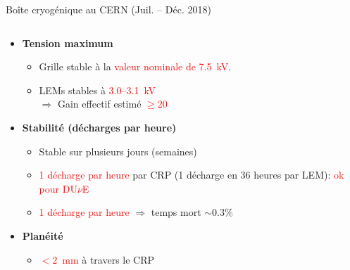 \begin{frame}{Boîte cryogénique au CERN (Juil. -- Déc. 2018)}
\begin{columns}
\begin{column}{0.6\textwidth}
\begin{scriptsize}
	    			\begin{itemize}
	    				\item \textbf{Tension maximum}
	    				\begin{itemize}
	    					\item Grille stable à la \textcolor{red}{valeur nominale de \SI{7.5}{\kilo\volt}}.
	    					\item LEMs stables à \textcolor{red}{3.0--\SI{3.1}{\kilo\volt}}\\
				    					$\Rightarrow$ Gain effectif estimé \textcolor{red}{$\geq 20$}
	    				\end{itemize}
	    				\item \textbf{Stabilité (décharges par heure)}
	    				\begin{itemize}
	    					\item Stable sur plusieurs jours (semaines)
	    					\item \textcolor{red}{1 décharge par heure} par CRP (1 décharge en 36 heures par LEM): \textcolor{red}{ok pour DU$\nu$E}
	    					\item \textcolor{red}{1 décharge par heure} $\Rightarrow$ temps mort $\sim$0.3\%
	    				\end{itemize}
	    				\item \textbf{Planéité}
	    				\begin{itemize}
	    					\item \textcolor{red}{$<$\SI{2}{\milli\meter}} à travers le CRP 
	    				\end{itemize}
	    			\end{itemize}
	    		\end{scriptsize}
    		\end{column}
    	\end{columns}
	    \end{frame}

        {
           	\setlength\pdfpagewidth{12.8cm}%
           	\setlength\pdfpageheight{9cm}%
           	\begin{frame}[plain]
           	\end{frame}
        }
        
